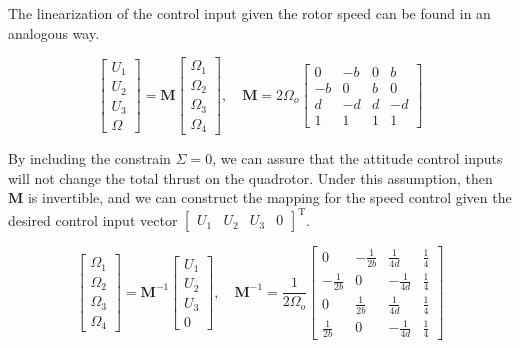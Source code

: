 \documentclass[12pt]{article}
\begin{document}
The linearization of the control input given the rotor speed can be found in an analogous way.

\begin{equation}
  \label{eq:controls}
  \begin{bmatrix}
  U_1 \\ U_2 \\ U_3 \\ \Omega
  \end{bmatrix} = \mathbf{M}
  \begin{bmatrix}
  \Omega_1 \\ \Omega_2 \\ \Omega_3 \\ \Omega_4
  \end{bmatrix},\quad \mathbf{M} = 2\Omega_o
  \begin{bmatrix}
  0 & -b & 0 & b \\ 
  -b & 0 & b & 0 \\ 
  d & -d & d & -d \\
  1 & 1 & 1 & 1
  \end{bmatrix}
\end{equation}

By including the constrain $ \Sigma = 0$, we can assure that the attitude control inputs will not change the total thrust on the quadrotor. Under this assumption, then $ \mathbf{M} $ is invertible, and we can construct the mapping for the speed control given the desired control input vector $ \begin{bmatrix} U_1  & U_2 & U_3 & 0\end{bmatrix}^\mathrm{T} $.

\begin{equation}
    \begin{bmatrix}
    \Omega_1 \\ \Omega_2 \\ \Omega_3 \\ \Omega_4
    \end{bmatrix} = 
    \mathbf{M}^{-1} \begin{bmatrix} U_1 \\ U_2 \\ U_3 \\ 0 \end{bmatrix},\quad
    \mathbf{M}^{-1} = \frac{1}{2 \Omega_o}
    \begin{bmatrix}
    0 & -\frac{1}{2b} & \frac{1}{4d} & \frac{1}{4} \\ 
    -\frac{1}{2b} & 0 & -\frac{1}{4d} & \frac{1}{4} \\ 
    0 & \frac{1}{2b} & \frac{1}{4d} & \frac{1}{4} \\
    \frac{1}{2b} & 0 & -\frac{1}{4d} & \frac{1}{4}
    \end{bmatrix}
\end{equation}
\end{document}

